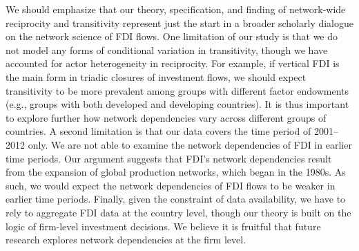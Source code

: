 \documentclass[reqno,onecolumn,letterpaper,12pt]{article}
\begin{document}
We should emphasize that our theory, specification, and finding of network-wide reciprocity and transitivity represent just the start in a broader scholarly dialogue on the network science of FDI flows. One limitation of our study is that we do not model any forms of conditional variation in transitivity, though we have accounted for actor heterogeneity in reciprocity. %
For example, if vertical FDI is the main form in triadic closures of investment flows, we should expect transitivity to be more prevalent among groups with different factor endowments (e.g., groups with both developed and developing countries). It is thus important to explore further how network dependencies vary across different groups of countries. %
A second limitation is that our data covers the time period of 2001--2012 only. We are not able to examine the network dependencies of FDI in earlier time periods. Our argument suggests that FDI's network dependencies result from the expansion of global production networks, which began in the 1980s. As such, we would expect the network dependencies of FDI flows to be weaker in earlier time periods. Finally, given the constraint of data availability, we have to rely to aggregate FDI data at the country level, though our theory is built on the logic of firm-level investment decisions. We believe it is fruitful that future research explores network dependencies at the firm level.
\end{document}

